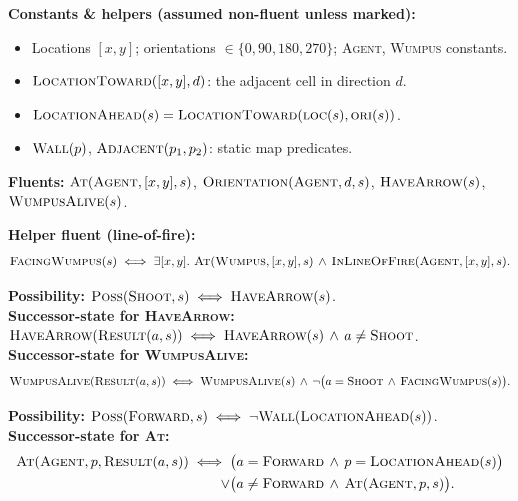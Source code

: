 \documentclass[11pt,a4paper]{article}
\newcommand{\pred}[1]{\textsc{#1}}
\newcommand{\Result}{\pred{Result}}
\newcommand{\Poss}{\pred{Poss}}
\newcommand{\key}{\textbf{\textcolor{keyrule}{\large$\bigstar$}}\ }
\begin{document}
\textbf{Constants \& helpers (assumed non-fluent unless marked):}
\begin{itemize}[leftmargin=*,itemsep=0pt]
  \item Locations $[x,y]$; orientations $\in \{0, 90, 180, 270\}$; \pred{Agent}, \pred{Wumpus} constants.
  \item $\pred{LocationToward}([x,y], d)$: the adjacent cell in direction $d$.
  \item $\pred{LocationAhead}(s) = \pred{LocationToward}(\pred{loc}(s),\pred{ori}(s))$.
  \item $\pred{Wall}(p)$, $\pred{Adjacent}(p_1, p_2)$: static map predicates.
\end{itemize}

\textbf{Fluents:} $\pred{At}(\pred{Agent},[x,y],s)$, $\pred{Orientation}(\pred{Agent},d,s)$, $\pred{HaveArrow}(s)$, $\pred{WumpusAlive}(s)$.

\textbf{Helper fluent (line-of-fire):}
\[
  \pred{FacingWumpus}(s) \iff \exists [x,y].\ \pred{At}(\pred{Wumpus},[x,y],s)\,\wedge\,\pred{InLineOfFire}(\pred{Agent},[x,y],s).
\]

\begin{keybox}[\key Shoot]
\textbf{Possibility:} $\Poss(\pred{Shoot}, s) \iff \pred{HaveArrow}(s)$.\\[2pt]
\textbf{Successor-state for \pred{HaveArrow}:}
$\pred{HaveArrow}(\Result(a,s)) \iff \pred{HaveArrow}(s)\,\wedge\,a \neq \pred{Shoot}$.\\[2pt]
\textbf{Successor-state for \pred{WumpusAlive}:}
\[
  \pred{WumpusAlive}(\Result(a,s)) \iff \pred{WumpusAlive}(s)\,\wedge\,\neg\big(a=\pred{Shoot}\,\wedge\,\pred{FacingWumpus}(s)\big).
\]
\end{keybox}

\begin{keybox}[\key Move (Forward)]
\textbf{Possibility:} $\Poss(\pred{Forward}, s) \iff \neg \pred{Wall}(\pred{LocationAhead}(s))$.\\[2pt]
\textbf{Successor-state for \pred{At}:}
\begin{align*}
  \pred{At}(\pred{Agent}, p, \Result(a, s)) \iff{}&
  \big(a = \pred{Forward}\,\wedge\,p = \pred{LocationAhead}(s)\big)\\
  \vee{}& \big(a \neq \pred{Forward}\,\wedge\,\pred{At}(\pred{Agent}, p, s)\big).
\end{align*}
\end{keybox}
\end{document}
